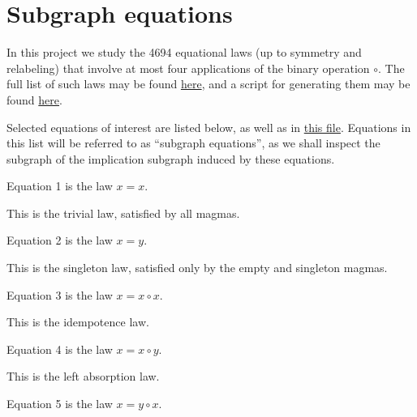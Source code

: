 \chapter{Subgraph equations}\label{subgraph-eq}

In this project we study the 4694 equational laws (up to symmetry and relabeling) that involve at most four applications of the binary operation $\circ$.  The full list of such laws may be found \href{https://github.com/teorth/equational_theories/blob/main/equational_theories/AllEquations.lean}{here}, and a script for generating them may be found \href{https://github.com/teorth/equational_theories/blob/main/scripts/generate_eqs_list.py}{here}.

Selected equations of interest are listed below, as well as in \href{https://github.com/teorth/equational_theories/blob/main/equational_theories/Equations.lean}{this file}.  Equations in this list will be referred to as ``subgraph equations'', as we shall inspect the subgraph of the implication subgraph induced by these equations.

\begin{definition}[Equation 1]\label{eq1}\leanok{}  Equation 1 is the law $x=x$.
\end{definition}

This is the trivial law, satisfied by all magmas.


\begin{definition}[Equation 2]\label{eq2}\leanok{}  Equation 2 is the law $x=y$.
\end{definition}

This is the singleton law, satisfied only by the empty and singleton magmas.

\begin{definition}[Equation 3]\label{eq3}\leanok{}  Equation 3 is the law $x=x \circ x$.
\end{definition}

This is the idempotence law.

\begin{definition}[Equation 4]\label{eq4}\leanok{}  Equation 4 is the law $x=x \circ y$.
\end{definition}

This is the left absorption law.

\begin{definition}[Equation 5]\label{eq5}\leanok{}  Equation 5 is the law $x=y \circ x$.
\end{definition}

